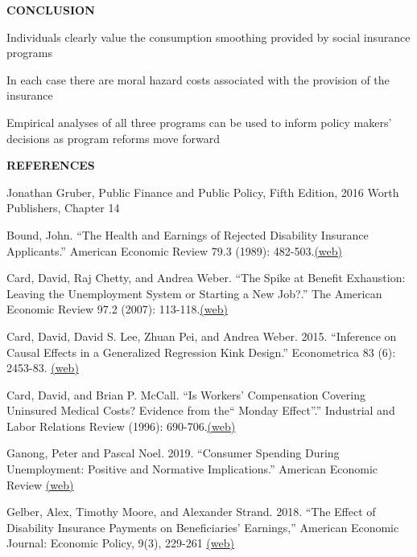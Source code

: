\documentclass[landscape]{slides}
\begin{document}
\begin{slide}
\begin{center}
{\bf CONCLUSION}
\end{center}

Individuals clearly value the consumption smoothing provided by social insurance programs

In each case there are moral hazard costs associated with the provision of the insurance

Empirical analyses of all three programs can be used to inform policy makers' decisions as program reforms move forward
\end{slide}



\begin{slide}
\begin{center}
{\bf REFERENCES}
\end{center}
{\small

Jonathan Gruber, Public Finance and Public Policy, Fifth Edition, 2016 Worth Publishers, Chapter 14

Bound, John. ``The Health and Earnings of Rejected Disability Insurance Applicants.'' American Economic Review 79.3 (1989): 482-503.\href{http://www.jstor.org/stable/pdfplus/1806858.pdf}{(web)}

Card, David, Raj Chetty, and Andrea Weber. ``The Spike at Benefit Exhaustion: Leaving the Unemployment System or Starting a New Job?.'' The American Economic Review 97.2 (2007): 113-118.\href{http://www.jstor.org/stable/pdfplus/30034431.pdf}{(web)}

Card, David, David S. Lee, Zhuan Pei, and Andrea Weber. 2015. ``Inference on Causal Effects in a
Generalized Regression Kink Design.'' Econometrica 83 (6): 2453-83.
\href{https://www.jstor.org/stable/pdf/43866417.pdf} {(web)}


Card, David, and Brian P. McCall. ``Is Workers' Compensation Covering Uninsured Medical Costs? Evidence from the`` Monday Effect''.'' Industrial and Labor Relations Review (1996): 690-706.\href{http://elsa.berkeley.edu/~saez/course131/Card-McCall96}{(web)}


Ganong, Peter  and Pascal Noel. 2019. ``Consumer Spending During Unemployment: Positive and Normative Implications.''  American Economic Review
\href{http://elsa.berkeley.edu/~saez/course131/ganong-noelAER19UI.pdf}{(web)}


Gelber, Alex, Timothy Moore, and Alexander Strand. 2018. ``The Effect of Disability Insurance Payments on Beneficiaries' Earnings,'' American Economic Journal: Economic Policy, 9(3),  229-261
\href{http://elsa.berkeley.edu/~saez/course/gelbermoorestrandDI17earnings.pdf} {(web)} 


}
\end{slide}
\end{document}
